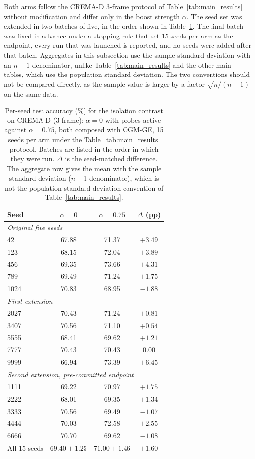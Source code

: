 \documentclass{article}
\begin{document}
Both arms follow the CREMA-D 3-frame protocol of Table~\ref{tab:main_results} without modification and differ only in the boost strength $\alpha$. The seed set was extended in two batches of five, in the order shown in Table~\ref{tab:perseed}. The final batch was fixed in advance under a stopping rule that set 15 seeds per arm as the endpoint, every run that was launched is reported, and no seeds were added after that batch. Aggregates in this subsection use the sample standard deviation with an $n-1$ denominator, unlike Table~\ref{tab:main_results} and the other main tables, which use the population standard deviation. The two conventions should not be compared directly, as the sample value is larger by a factor $\sqrt{n/(n-1)}$ on the same data.

\begin{table}[H]
\centering
\caption{Per-seed test accuracy (\%) for the isolation contrast on CREMA-D (3-frame): $\alpha{=}0$ with probes active against $\alpha{=}0.75$, both composed with OGM-GE, 15 seeds per arm under the Table~\ref{tab:main_results} protocol. Batches are listed in the order in which they were run. $\Delta$ is the seed-matched difference. The aggregate row gives the mean with the sample standard deviation ($n-1$ denominator), which is not the population standard deviation convention of Table~\ref{tab:main_results}.}
\label{tab:perseed}
\begin{tabular}{lccc}
\toprule
\textbf{Seed} & \textbf{$\alpha{=}0$} & \textbf{$\alpha{=}0.75$} & \textbf{$\Delta$ (pp)} \\
\midrule
\multicolumn{4}{l}{\textit{Original five seeds}} \\
42    & 67.88 & 71.37 & $+3.49$ \\
123   & 68.15 & 72.04 & $+3.89$ \\
456   & 69.35 & 73.66 & $+4.31$ \\
789   & 69.49 & 71.24 & $+1.75$ \\
1024  & 70.83 & 68.95 & $-1.88$ \\
\midrule
\multicolumn{4}{l}{\textit{First extension}} \\
2027  & 70.43 & 71.24 & $+0.81$ \\
3407  & 70.56 & 71.10 & $+0.54$ \\
5555  & 68.41 & 69.62 & $+1.21$ \\
7777  & 70.43 & 70.43 & $0.00$ \\
9999  & 66.94 & 73.39 & $+6.45$ \\
\midrule
\multicolumn{4}{l}{\textit{Second extension, pre-committed endpoint}} \\
1111  & 69.22 & 70.97 & $+1.75$ \\
2222  & 68.01 & 69.35 & $+1.34$ \\
3333  & 70.56 & 69.49 & $-1.07$ \\
4444  & 70.03 & 72.58 & $+2.55$ \\
6666  & 70.70 & 69.62 & $-1.08$ \\
\midrule
All 15 seeds & $69.40 \pm 1.25$ & $71.00 \pm 1.46$ & $+1.60$ \\
\bottomrule
\end{tabular}
\end{table}
\end{document}
